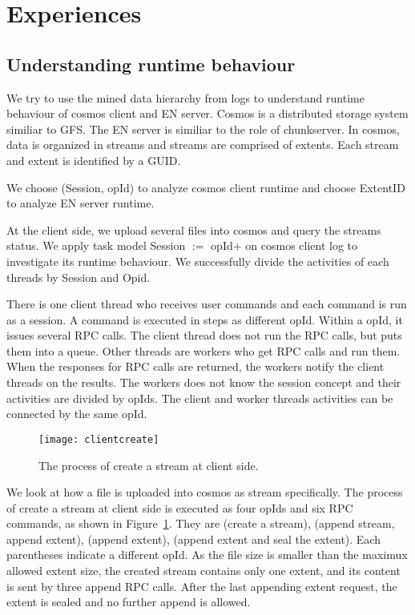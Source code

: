 
\section{Experiences}
\label{sec:exp}


\subsection{Understanding runtime behaviour}

We try to use the mined data hierarchy from logs to
understand runtime behaviour of cosmos client and EN server.
Cosmos is a distributed storage system similiar to GFS. The
EN server is similiar to the role of chunkserver. In cosmos,
data is organized in streams and streams are comprised of
extents. Each stream and extent is identified by a GUID.

We choose (Session, opId) to analyze cosmos client runtime
and choose ExtentID to analyze EN server runtime.

At the client side, we upload several files into cosmos and
query the streams status. We apply task model Session $:=$
opId$+$ on cosmos client log to investigate its runtime
behaviour. We successfully divide the activities of each
threads by Session and Opid.

There is one client thread who receives user commands and
each command is run as a session. A command is executed in
steps as different opId. Within a opId, it issues several
RPC calls. The client thread does not run the RPC calls, but
puts them into a queue. Other threads are workers who get
RPC calls and run them. When the responses for RPC calls are
returned, the workers notify the client threads on the
results. The workers does not know the session concept and
their activities are divided by opIds. The client and worker
threads activities can be connected by the same opId.

\begin{figure}
\centering
\texttt{[image: clientcreate]}
\caption{The process of create a stream at client side.}
\label{fig:clientcreate}
\end{figure}

We look at how a file is uploaded into cosmos as stream
specifically. The process of create a stream at client side
is executed as four opIds and six RPC commands, as shown in
Figure~\ref{fig:clientcreate}. They are (create a stream),
(append stream, append extent), (append extent), (append
extent and seal the extent). Each parentheses indicate a
different opId. As the file size is smaller than the maximux
allowed extent size, the created stream contains only one
extent, and its content is sent by three append RPC calls.
After the last appending extent request, the extent is
sealed and no further append is allowed.


